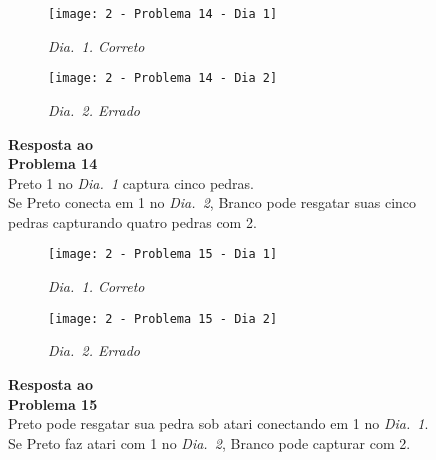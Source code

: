 \begin{SCfigure}[][h!]
    \begin{subfigure}[t]{.31\textwidth}
        \texttt{[image: 2 - Problema 14 - Dia 1]}
        \captionsetup{justification=centering}
        \caption*{\emph{Dia.\@~1. Correto}}
    \end{subfigure}
    \hfill
    \begin{subfigure}[t]{.31\textwidth}
        \texttt{[image: 2 - Problema 14 - Dia 2]}
        \captionsetup{justification=centering}
        \caption*{\emph{Dia.\@~2. Errado}}
    \end{subfigure}
    \hfill
    \caption*{\textbf{Resposta ao\\Problema 14}\\\vspace*{.25cm}Preto 1 no \emph{Dia.\@~1} captura cinco pedras.\\\vspace*{.25cm}Se Preto conecta em 1 no \emph{Dia.\@~2}, Branco pode resgatar suas cinco pedras capturando quatro pedras com 2.}
\end{SCfigure}

\vfill

\begin{SCfigure}[][h!]
    \begin{subfigure}[t]{.31\textwidth}
        \texttt{[image: 2 - Problema 15 - Dia 1]}
        \captionsetup{justification=centering}
        \caption*{\emph{Dia.\@~1. Correto}}
    \end{subfigure}
    \hfill
    \begin{subfigure}[t]{.31\textwidth}
        \texttt{[image: 2 - Problema 15 - Dia 2]}
        \captionsetup{justification=centering}
        \caption*{\emph{Dia.\@~2. Errado}}
    \end{subfigure}
    \hfill
    \caption*{\textbf{Resposta ao\\Problema 15}\\\vspace*{.25cm}Preto pode resgatar sua pedra sob atari conectando em 1 no \emph{Dia.\@~1}.\\\vspace*{.25cm}Se Preto faz atari com 1 no \emph{Dia.\@~2}, Branco pode capturar com 2.}
\end{SCfigure}

\pagebreak

